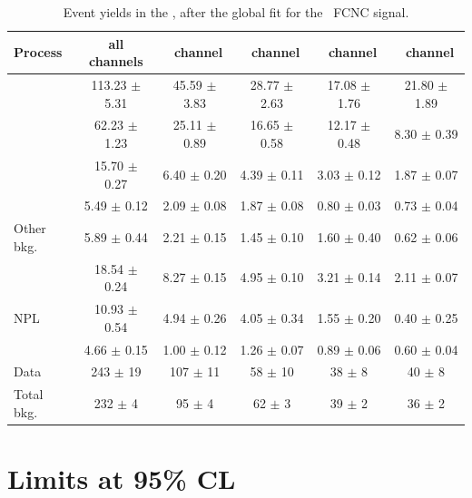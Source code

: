 \begin{landscape}
	\vspace*{\fill}
	
	\begin{table}[htbp]
		\centering
		\caption{Event yields in the \TTSR, after the global fit for the \Zut\ FCNC signal.  }	
		\begin{tabular} {l c c c c c}
			\toprule
			Process & all channels & \mumumu\ channel & \emumu\ channel & \eemu\ channel &\eee\ channel \\
			\midrule
			\NPL\ \DY  		& 113.23 $ \pm $  5.31 & 45.59 $\pm$  3.83 & 28.77 $\pm$  2.63 & 17.08 $\pm$ 1.76 & 21.80 $\pm$ 1.89 \\ 
			\ttZ 			&  62.23 $ \pm $  1.23 & 25.11 $\pm$  0.89 & 16.65 $\pm$  0.58 & 12.17 $\pm$ 0.48 &  8.30 $\pm$ 0.39 \\ 
			\WZ 			&  15.70 $ \pm $  0.27 &  6.40 $\pm$  0.20 &  4.39 $\pm$  0.11 &  3.03 $\pm$ 0.12 &  1.87 $\pm$ 0.07 \\ 
			\ZZ 			&   5.49 $ \pm $  0.12 &  2.09 $\pm$  0.08 &  1.87 $\pm$  0.08 & 0.80 $\pm$ 0.03 &  0.73 $\pm$ 0.04 \\ 
			Other bkg. 		&   5.89 $ \pm $  0.44 &  2.21 $\pm$  0.15 &  1.45 $\pm$  0.10 & 1.60 $\pm$ 0.40 &  0.62 $\pm$ 0.06\\ 
			\tZq 			&  18.54 $ \pm $  0.24 &  8.27 $\pm$  0.15 &  4.95 $\pm$  0.10 & 3.21 $\pm$ 0.14 &  2.11 $\pm$ 0.07\\ 
			NPL \ttbar      &   10.93 $ \pm $ 0.54 &  4.94 $\pm$  0.26 &  4.05 $\pm$  0.34 & 1.55 $\pm$ 0.20 &  0.40 $\pm$ 0.25 \B\\
			\kZut  			&   4.66 $ \pm $  0.15 &  1.00 $\pm$  0.12 &  1.26 $\pm$  0.07 & 0.89 $\pm$ 0.06 &  0.60 $\pm$ 0.04 \T\B\\
			\hdashline
			Data 			& 243 $ \pm $ 19 & 107 $\pm$ 11 & 58 $\pm$ 10 & 38 $\pm$ 8 & 40 $\pm$ 8 \T \\
			Total bkg. 	& 232 $ \pm $  4 &  95 $\pm$  4 & 62 $\pm$ 3 & 39 $\pm$ 2 & 36 $\pm$ 2 \\
			\bottomrule
		\end{tabular}
		\label{tab:PYieldTTSR}
	\end{table}
	
	
	\vspace*{\fill}
\end{landscape}
\newpage
\section{Limits at 95\% CL}
\label{sec:limits}
